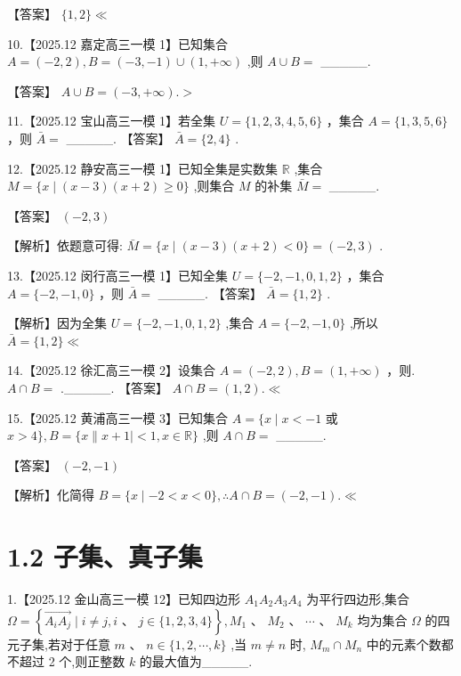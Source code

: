 \documentclass[10pt]{article}
\begin{document}
【答案】 \(\{ 1,2\}  \ll\)

10.【2025.12 嘉定高三一模 1】已知集合 \(A = \left( {-2,2}\right) ,B = \left( {-3, - 1}\right)  \cup  \left( {1, + \infty }\right)\) ,则 \(A \cup  B =\) \_\_\_\_\_.

【答案】 \(A \cup  B = \left( {-3, + \infty }\right) . >\)

11.【2025.12 宝山高三一模 1】若全集 \(U = \{ 1,2,3,4,5,6\}\) ，集合 \(A = \{ 1,3,5,6\}\) ，则 \(\bar{A} =\) \_\_\_\_\_. 【答案】 \(\bar{A} = \{ 2,4\}\) .

12.【2025.12 静安高三一模 1】已知全集是实数集 \(\mathbb{R}\) ,集合 \(M = \{ x \mid  \left( {x - 3}\right) \left( {x + 2}\right)  \geq  0\}\) ,则集合 \(M\) 的补集 \(\bar{M} =\) \_\_\_\_\_.

【答案】 \(\left( {-2,3}\right)\)

【解析】依题意可得: \(\bar{M} = \{ x \mid  \left( {x - 3}\right) \left( {x + 2}\right)  < 0\}  = \left( {-2,3}\right)\) .

13.【2025.12 闵行高三一模 1】已知全集 \(U = \{  - 2, - 1,0,1,2\}\) ，集合 \(A = \{  - 2, - 1,0\}\) ，则 \(\bar{A} =\) \_\_\_\_\_. 【答案】 \(\bar{A} = \{ 1,2\}\) .

【解析】因为全集 \(U = \{  - 2, - 1,0,1,2\}\) ,集合 \(A = \{  - 2, - 1,0\}\) ,所以 \(\bar{A} = \{ 1,2\}  \ll\)

14.【2025.12 徐汇高三一模 2】设集合 \(A = \left( {-2,2}\right) ,B = \left( {1, + \infty }\right)\) ，则. \(A \cap  B =\) .\_\_\_\_\_. 【答案】 \(A \cap  B = \left( {1,2}\right) . \ll\)

15.【2025.12 黄浦高三一模 3】已知集合 \(A = \{ x \mid  x <  - 1\) 或 \(x > 4\} ,B = \{ x\parallel x + 1 \mid   < 1,x \in  \mathbb{R}\}\) ,则 \(A \cap  B =\) \_\_\_\_\_.

【答案】 \(\left( {-2, - 1}\right)\)

【解析】化简得 \(B = \{ x \mid   - 2 < x < 0\} ,\therefore A \cap  B = \left( {-2, - 1}\right) . \ll\)

\section*{1.2 子集、真子集}

1.【2025.12 金山高三一模 12】已知四边形 \({A}_{1}{A}_{2}{A}_{3}{A}_{4}\) 为平行四边形,集合 \(\Omega  = \left\{  {\overrightarrow{{A}_{i}{A}_{j}} \mid  i \neq  j,i\text{ 、 }j \in  \{ 1,2,3,4\} }\right\}  ,{M}_{1}\text{ 、 }{M}_{2}\text{ 、 }\cdots \text{ 、 }{M}_{k}\) 均为集合 \(\Omega\) 的四元子集,若对于任意 \(m\text{ 、 }n \in  \{ 1,2,\cdots ,k\}\) ,当 \(m \neq  n\) 时, \({M}_{m} \cap  {M}_{n}\) 中的元素个数都不超过 2 个,则正整数 \(k\) 的最大值为\_\_\_\_\_.
\end{document}
